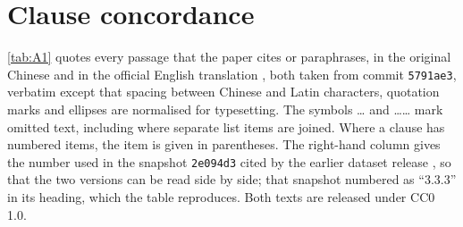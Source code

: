 \section{Clause concordance}\label{app:A}

\cref{tab:A1} quotes every \pol{} passage that the paper cites or paraphrases, in the original Chinese \cite{pol2text} and in the official English translation \cite{pol2en}, both taken from commit \texttt{5791ae3}, verbatim except that spacing between Chinese and Latin characters, quotation marks and ellipses are normalised for typesetting. The symbols \ldots{} and \ldots\ldots{} mark omitted text, including where separate list items are joined. Where a clause has numbered items, the item is given in parentheses. The right-hand column gives the number used in the snapshot \texttt{2e094d3} cited by the earlier dataset release \cite{survey01}, so that the two versions can be read side by side; that snapshot numbered  as ``3.3.3'' in its heading, which the table reproduces. Both texts are released under CC0 1.0.

